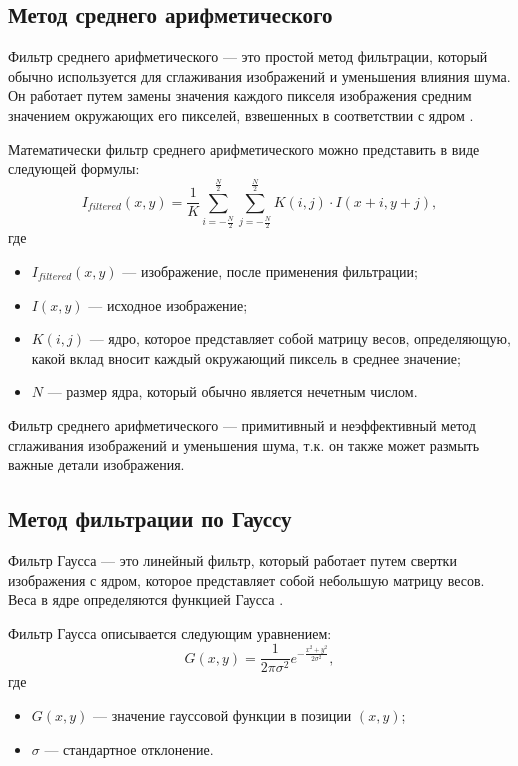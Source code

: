 \subsection{Метод среднего арифметического}

Фильтр среднего арифметического --- это простой метод фильтрации, который обычно используется для сглаживания изображений и уменьшения влияния шума. Он работает путем замены значения каждого пикселя изображения средним значением окружающих его пикселей, взвешенных в соответствии с ядром \cite{meanfilter}.

Математически фильтр среднего арифметического можно представить в виде следующей формулы:
\begin{equation}
    I_{filtered}(x,y) = \frac{1}{K} \sum_{i=-\frac{N}{2}}^{\frac{N}{2}} \sum_{j=-\frac{N}{2}}^{\frac{N}{2}} K(i,j)\cdot I(x+i,y+j),
\end{equation}
где
\begin{itemize}
    \item $I_{filtered}(x,y)$ --- изображение, после применения фильтрации;
    \item $I(x,y)$ --- исходное изображение;
    \item $K(i,j)$ --- ядро, которое представляет собой матрицу весов, определяющую, какой вклад вносит каждый окружающий пиксель в среднее значение;
    \item $N$ --- размер ядра, который обычно является нечетным числом.
\end{itemize}

Фильтр среднего арифметического --- примитивный и неэффективный метод сглаживания изображений и уменьшения шума, т.к. он также может размыть важные детали изображения.

\subsection{Метод фильтрации по Гауссу}
Фильтр Гаусса --- это линейный фильтр, который работает путем свертки изображения с ядром, которое представляет собой небольшую матрицу весов. Веса в ядре определяются функцией Гаусса \cite{gaussianfilter}.

Фильтр Гаусса описывается следующим уравнением:
\begin{equation}
    G(x,y) = \frac{1}{2\pi\sigma^2}e^{-\frac{x^2+y^2}{2\sigma^2}},
\end{equation}
где 
\begin{itemize}
    \item $G(x,y)$ --- значение гауссовой функции в позиции $(x,y)$;
    \item $\sigma$ --- стандартное отклонение.
\end{itemize}

